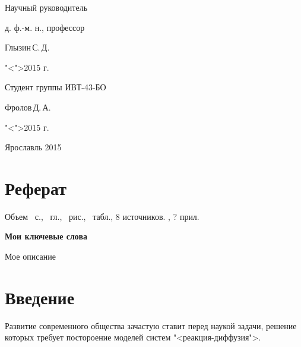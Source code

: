 \documentclass[a4paper, 14pt]{extarticle}
\theoremstyle{definition}
\begin{document}
{\medskip

\begin{flushright}
	Научный руководитель\par
	д. ф.-м. н., профессор\par
	\underline{\hspace{3.5cm}}Глызин\,С.\,Д.\par
	"<\underline{\hspace{0.8cm}}">\underline{\hspace{3.5cm}}2015 г.\par
\end{flushright}

\bigskip 

\begin{flushright}
	Студент группы ИВТ-43-БО\par
	\underline{\hspace{2.5cm}}Фролов\,Д.\,А.\par
	"<\underline{\hspace{0.8cm}}">\underline{\hspace{3.5cm}}2015 г.\par
\end{flushright}

\vspace{\fill}

\begin{center}
	Ярославль 2015
\end{center}

\clearpage
}



\section*{Реферат}
\noindent Объем \pageref*{LastPage}~с., 
\totsections~гл., \totfig~рис., \tottab~табл., 
8 источников.
, ? прил. 

\noindent\textbf{Мои ключевые слова}

Мое описание

\tableofcontents





\section*{Введение}

\par Развитие современного общества зачастую ставит перед наукой задачи, решение которых требует постороение моделей систем "<реакция-диффузия">.
\end{document}
